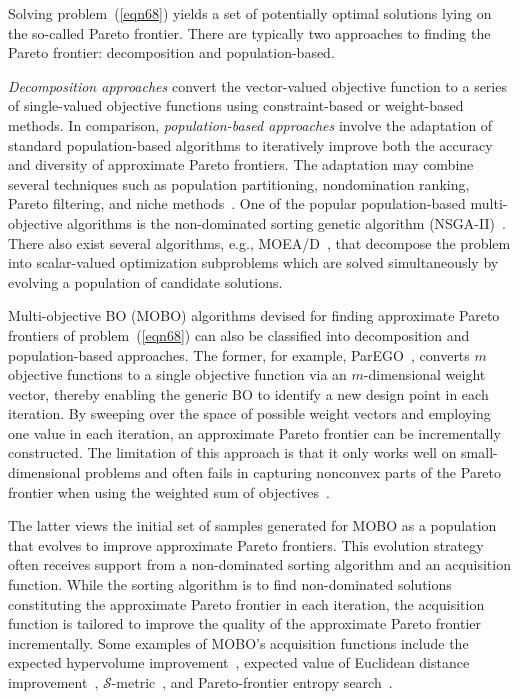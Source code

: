 \documentclass[journal ]{new-aiaa}
\begin{document}
Solving problem~(\ref{eqn68}) yields a set of potentially optimal solutions lying on the so-called Pareto frontier.
There are typically two approaches to finding the Pareto frontier: decomposition and population-based.

\textit{Decomposition approaches} convert the vector-valued objective function to a series of single-valued objective functions using constraint-based or weight-based methods.
In comparison, \textit{population-based approaches} involve the adaptation of standard population-based algorithms to iteratively improve both the accuracy and diversity of approximate Pareto frontiers. The adaptation may combine several techniques such as population partitioning, nondomination ranking, Pareto filtering, and niche methods~\citep{Kochenderfer2019}. 
One of the popular population-based multi-objective algorithms is the non-dominated sorting genetic algorithm (NSGA-II)~\citep{Deb2002}.
There also exist several algorithms, e.g., MOEA/D~\citep{ZhangQ2007}, that decompose the problem into scalar-valued optimization subproblems which are solved simultaneously by evolving a population of candidate solutions. 

Multi-objective BO (MOBO) algorithms devised for finding approximate Pareto frontiers of problem~(\ref{eqn68}) can also be classified into decomposition and population-based approaches.
The former, for example, ParEGO~\citep{Knowles2006}, converts $m$ objective functions to a single objective function via an $m$-dimensional weight vector, thereby enabling the generic BO to identify a new design point in each iteration.
By sweeping over the space of possible weight vectors and employing one value in each iteration, an approximate Pareto frontier can be incrementally constructed.
The limitation of this approach is that it only works well on small-dimensional problems and often fails in capturing nonconvex parts of the Pareto frontier when using the weighted sum of objectives~\citep{Das1997}.

The latter views the initial set of samples generated for MOBO as a population that evolves to improve approximate Pareto frontiers.
This evolution strategy often receives support from a non-dominated sorting algorithm and an acquisition function.
While the sorting algorithm is to find non-dominated solutions constituting the approximate Pareto frontier in each iteration, the acquisition function is tailored to improve the quality of the approximate Pareto frontier incrementally.
Some examples of MOBO's acquisition functions include the expected hypervolume improvement~\citep{Emmerich2006}, expected value of Euclidean distance improvement~\citep{Keane2006}, $\mathcal{S}$-metric~\citep{Ponweiser2008}, and Pareto-frontier entropy search~\citep{Suzuki2020}.
\end{document}
